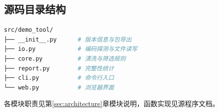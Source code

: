 \subsection{源码目录结构}
\label{ssec:dir_structure}
\begin{lstlisting}[language=bash,style=blockstyle]
src/demo_tool/
├── __init__.py      # 版本信息与包导出
├── io.py            # 编码探测与文件读写
├── core.py          # 清洗与筛选规则
├── report.py        # 完整性统计
├── cli.py           # 命令行入口
└── web.py           # 浏览器界面
\end{lstlisting}
各模块职责见第\ref{sec:architecture}章模块说明，函数实现见源程序文档。
